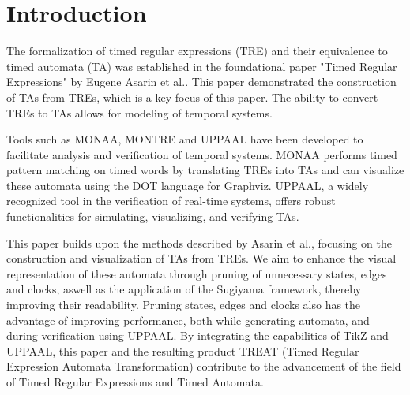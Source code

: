 \section{Introduction}
The formalization of timed regular expressions (TRE) and their equivalence to timed automata (TA) was established in the foundational paper "Timed Regular Expressions" by Eugene Asarin et al.\cite{Eugene2001}.
This paper demonstrated the construction of TAs from TREs, which is a key focus of this paper.
The ability to convert TREs to TAs allows for modeling of temporal systems.

Tools such as MONAA, MONTRE and UPPAAL have been developed to facilitate analysis and verification of temporal systems.
MONAA performs timed pattern matching on timed words by translating TREs into TAs and can visualize these automata using the DOT language for Graphviz.
UPPAAL, a widely recognized tool in the verification of real-time systems, offers robust functionalities for simulating, visualizing, and verifying TAs.

This paper builds upon the methods described by Asarin et al., focusing on the construction and visualization of TAs from TREs.
We aim to enhance the visual representation of these automata through pruning of unnecessary states, edges and clocks, aswell as the application of the Sugiyama framework, thereby improving their readability.
Pruning states, edges and clocks also has the advantage of improving performance, both while generating automata, and during verification using UPPAAL.
By integrating the capabilities of TikZ and UPPAAL, this paper and the resulting product TREAT (Timed Regular Expression Automata Transformation) contribute to the advancement of the field of Timed Regular Expressions and Timed Automata.